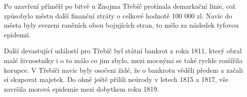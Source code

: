 \documentclass[a4paper,oneside,12p]{report}
\let\openright=\clearpage
\begin{document}
Po uzavření příměří po bitvě u Znojma Třebíč protínala demarkační linie, což způsobylo městu další finanční ztráty o celkové hodnotě 100 000 zl.
Navíc do města byly svezeni raněních obou bojujících stran, to mělo za následek tyfovou epidemii.

Další devastující událostí pro Třebíč byl státní bankrot z roku 1811, který obral malé živnostníky i o to málo co jim zbylo, mezi mocnými se také rychle rozšířila korupce.
V Třebíči navíc byly osočeni židé, že o bankrotu věděli předem a začali si skupovat majetek.
Do ohně ještě přilili neúrody v letech 1815 a 1817, vše završila morová epidemie mezi dobytkem roku 1819.




\listoffigures
\openright
\end{document}
